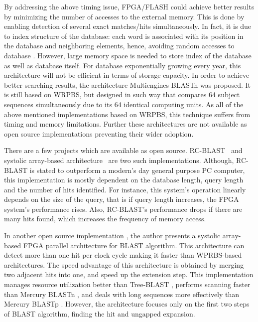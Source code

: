        
By addressing the above timing issue, FPGA/FLASH \cite{lavenier2007reconfigurable} could achieve better results by minimizing the number of accesses to the external memory. 
This is done by enabling detection of several exact matches/hits simultaneously. 
In fact, it is due to index structure of the database: each word is associated with its position in the database and neighboring elements, hence, avoiding random accesses to database \cite{guo2012systolic}. 
However, large memory space is needed to store index of the database as well as database itself. 
For database exponentially growing every year, this architecture will not be efficient in terms of storage capacity. 
In order to achieve better searching results, the architecture Multiengines BLASTn \cite{sotiriades2007design} was proposed. 
It is still based on WRPBS, but designed in such way that compares 64 subject sequences simultaneously due to its 64 identical computing units. 
As all of the above mentioned implementations based on WRPBS, this technique suffers from timing and memory limitations. 
Further these architectures are not available as open source implementations preventing their wider adoption.

There are a few projects which are available as open source. 
RC-BLAST~\cite{datta2009} and  systolic array-based architecture~\cite{guo2012open} are two such implementations.
Although, RC-BLAST is stated to outperform a modern's day general purpose PC computer, this implementation is mostly dependent on the database length, query length and the number of hits identified. 
For instance, this system's operation linearly depends on the size of the query, that is if query length increases, the FPGA system's performance rises. 
Also, RC-BLAST's performance drops if there are many hits found, which increases the frequency of memory access.

In another open source implementation \cite{guo2012open}, the author presents a systolic array-based FPGA parallel architecture for BLAST algorithm. 
This architecture can detect more than one hit per clock cycle making it faster than WPRBS-based architectures. 
The speed advantage of this architecture is obtained by merging two adjacent hits into one, and speed up the extension step. 
This implementation manages resource utilization better than Tree-BLAST \cite{herbordt2006single}, performs scanning faster than Mercury BLASTn \cite{buhler2007mercury}, and deals with long sequences more effectively than Mercury BLASTp \cite{harris2007banded}. 
However, the architecture focuses only on the first two steps of BLAST algorithm, finding the hit and ungapped expansion. 

